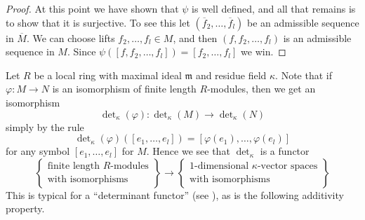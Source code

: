 \begin{proof}
\medskip\noindent
At this point we have shown that $\psi$ is well defined, and all that remains
is to show that it is surjective. To see this let
$(\overline{f}_2, \ldots, \overline{f}_l)$ be an admissible sequence
in $\overline{M}$. We can choose lifts $f_2, \ldots, f_l \in M$, and
then $(f, f_2, \ldots, f_l)$ is an admissible sequence in $M$.
Since $\psi([f, f_2, \ldots, f_l]) = [f_2, \ldots, f_l]$ we win.
\end{proof}

Let $R$ be a local ring with maximal ideal $\mathfrak m$ and
residue field $\kappa$. Note that if $\varphi : M \to N$ is an
isomorphism of finite length $R$-modules, then we get an
isomorphism
$$
\det\nolimits_\kappa(\varphi) :
\det\nolimits_\kappa(M)
\to
\det\nolimits_\kappa(N)
$$
simply by the rule
$$
\det\nolimits_\kappa(\varphi)([e_1, \ldots, e_l])
=
[\varphi(e_1), \ldots, \varphi(e_l)]
$$
for any symbol $[e_1, \ldots, e_l]$ for $M$.
Hence we see that $\det\nolimits_\kappa$ is a functor
\begin{equation}
\label{equation-functor}
\left\{
\begin{matrix}
\text{finite length }R\text{-modules}\\
\text{with isomorphisms}
\end{matrix}
\right\}
\longrightarrow
\left\{
\begin{matrix}
1\text{-dimensional }\kappa\text{-vector spaces}\\
\text{with isomorphisms}
\end{matrix}
\right\}
\end{equation}
This is typical for a ``determinant functor''
(see \cite{Knudsen}), as is the following additivity
property.

